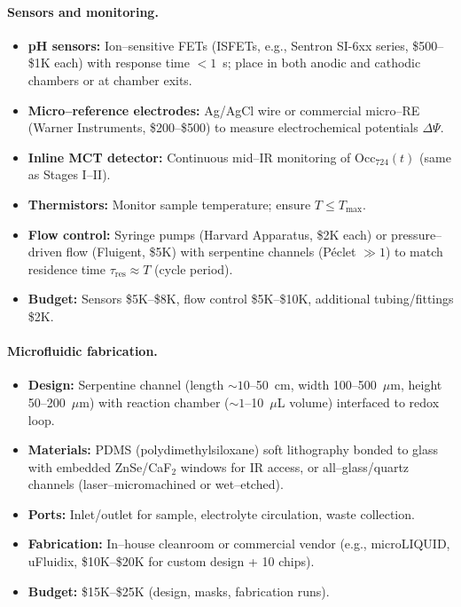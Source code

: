 \documentclass[11pt]{article}
\begin{document}
\paragraph{Sensors and monitoring.}
\begin{itemize}
\item \textbf{pH sensors:} Ion–sensitive FETs (ISFETs, e.g., Sentron SI-6xx series, \$500–\$1K each) with response time $<1$~s; place in both anodic and cathodic chambers or at chamber exits.
\item \textbf{Micro–reference electrodes:} Ag/AgCl wire or commercial micro–RE (Warner Instruments, \$200–\$500) to measure electrochemical potentials $\Delta\Psi$.
\item \textbf{Inline MCT detector:} Continuous mid–IR monitoring of $\mathrm{Occ}_{724}(t)$ (same as Stages I–II).
\item \textbf{Thermistors:} Monitor sample temperature; ensure $T\le T_{\max}$.
\item \textbf{Flow control:} Syringe pumps (Harvard Apparatus, \$2K each) or pressure–driven flow (Fluigent, \$5K) with serpentine channels (Péclet $\gg 1$) to match residence time $\tau_{\mathrm{res}}\approx T$ (cycle period).
\item \textbf{Budget:} Sensors \$5K–\$8K, flow control \$5K–\$10K, additional tubing/fittings \$2K.
\end{itemize}

\paragraph{Microfluidic fabrication.}
\begin{itemize}
\item \textbf{Design:} Serpentine channel (length $\sim 10$–50~cm, width 100–500~$\mu$m, height 50–200~$\mu$m) with reaction chamber ($\sim 1$–10~$\mu$L volume) interfaced to redox loop.
\item \textbf{Materials:} PDMS (polydimethylsiloxane) soft lithography bonded to glass with embedded ZnSe/CaF$_2$ windows for IR access, or all–glass/quartz channels (laser–micromachined or wet–etched).
\item \textbf{Ports:} Inlet/outlet for sample, electrolyte circulation, waste collection.
\item \textbf{Fabrication:} In–house cleanroom or commercial vendor (e.g., microLIQUID, uFluidix, \$10K–\$20K for custom design + 10 chips).
\item \textbf{Budget:} \$15K–\$25K (design, masks, fabrication runs).
\end{itemize}
\end{document}
